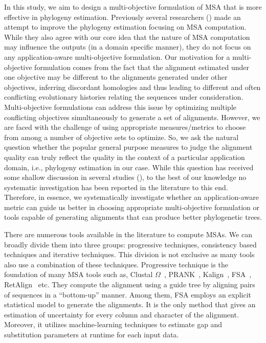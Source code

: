 In this study, we aim to design a multi-objective formulation of MSA that is more effective in phylogeny estimation. Previously several researchers (\citep{redelings2005joint, ashkenazy2018multiple}) made an attempt to improve the phylogeny estimation focusing on MSA computation. While they also agree with our core idea that the nature of MSA computation may influence the outputs (in a domain specific manner), they do not focus on any application-aware multi-objective formulation. %
Our motivation for a multi-objective formulation comes from the fact that the alignment estimated under one objective may be different to the alignments generated under other objectives, inferring discordant homologies and thus leading to different and often conflicting evolutionary histories relating the sequences under consideration. Multi-objective formulations can address this issue by optimizing multiple conflicting objectives simultaneously to generate a set of alignments. However, we are faced with the challenge of using appropriate measures/metrics to choose from among a number of objective sets to optimize. So, we ask the natural question whether the popular general purpose measures to judge the alignment quality can truly reflect the quality in the context of a particular application domain, i.e., phylogeny estimation in our case. While this question has received some shallow discussion in several studies (\citep{warnow2013large, mirarab2015pasta, liu2009rapid}), to the best of our knowledge no systematic investigation has been reported in the literature to this end. Therefore, in essence, we systematically investigate whether an application-aware metric can guide us better in choosing appropriate multi-objective formulation or tools capable of generating alignments that can produce better phylogenetic trees.


There are numerous tools available in the literature to compute MSAs. We can broadly divide them into three groups: progressive techniques, consistency based techniques and iterative techniques. This division is not exclusive as many tools also use a combination of these techniques. Progressive technique is the foundation of many MSA tools such as, Clustal $\Omega$~\citep{sievers2011fast}, PRANK~\citep{loytynoja2005algorithm}, Kalign~\citep{lassmann2008kalign2}, FSA~\citep{bradley2009fast}, RetAlign~\citep{szabo2010reticular} etc. They compute the alignment using a guide tree by aligning pairs of sequences in a ``bottom-up'' manner. Among them, FSA employs an explicit statistical model to generate the alignments. It is the only method that gives an estimation of uncertainty for every column and character of the alignment. Moreover, it utilizes machine-learning techniques to estimate gap and substitution parameters at runtime for each input data. 

